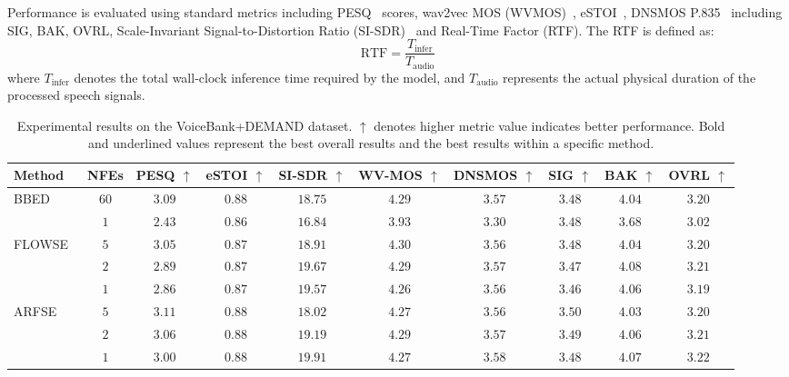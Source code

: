 \documentclass[cameraready]{Interspeech}
\begin{document}
Performance is evaluated using standard metrics including PESQ~\cite{recommendation2001perceptual} scores,  wav2vec MOS (WVMOS)~\cite{andreev2023hifi++}, eSTOI~\cite{jensen2016algorithm}, DNSMOS P.835~\cite{reddy2022dnsmos} including SIG, BAK, OVRL, Scale-Invariant Signal-to-Distortion Ratio (SI-SDR)~\cite{le2019sdr} and Real-Time Factor (RTF). The RTF is defined as:
\begin{equation}
    \text{RTF} = \frac{T_{\text{infer}}}{T_{\text{audio}}}
\end{equation}
where $T_{\text{infer}}$ denotes the total wall-clock inference time required by the model, and $T_{\text{audio}}$ represents the actual physical duration of the processed speech signals.


\begin{table}[t]
  \caption{Experimental results on the VoiceBank+DEMAND dataset. $\uparrow$ denotes higher metric value indicates better performance. Bold and underlined values represent the best overall results and the best results within a specific method.}
  \label{tab:vb_dmd}
  \centering
  \footnotesize
  \setlength{\tabcolsep}{7pt}
  \renewcommand\arraystretch{1.1}
  \begin{tabular}{l c c c c c c c c c}
    \toprule
    \textbf{Method} & \textbf{NFEs} & \textbf{PESQ} $\uparrow$ & \textbf{eSTOI} $\uparrow$ & \textbf{SI-SDR} $\uparrow$ & \textbf{WV-MOS} $\uparrow$ & \textbf{DNSMOS} $\uparrow$ & \textbf{SIG} $\uparrow$ & \textbf{BAK} $\uparrow$ & \textbf{OVRL} $\uparrow$ \\
    \midrule
    \multirow{2}{*}{BBED~\cite{lay23_interspeech}}
    & $60$ & \underline{$3.09$} & \underline{$0.88$} & \underline{$18.75$} & \underline{$4.29$} & \underline{$3.57$} & $3.48$ & \underline{$4.04$} & \underline{$3.20$} \\
    & $1$ & $2.43$ & $0.86$ & $16.84$ & $3.93$ & $3.30$ & $3.48$ & $3.68$ & $3.02$ \\
    \midrule
    \multirow{3}{*}{FLOWSE~\cite{10888274}}
    & $5$ & \underline{$3.05$} & $0.87$ & $18.91$ & \underline{$\mathbf{4.30}$} & $3.56$ & \underline{$3.48$} & $4.04$ & $3.20$ \\
    & $2$ & $2.89$ & $0.87$ & \underline{$19.67$} & $4.29$ & \underline{$3.57$} & $3.47$ & \underline{$\mathbf{4.08}$} & \underline{$3.21$} \\
    & $1$ & $2.86$ & $0.87$ & $19.57$ & $4.26$ & $3.56$ & $3.46$ & $4.06$ & $3.19$ \\
    \midrule
    \multirow{3}{*}{ARFSE}
    & $5$ & \underline{$\mathbf{3.11}$} & $0.88$ & $18.02$ & $4.27$ & $3.56$ & \underline{$\mathbf{3.50}$} & $4.03$ & $3.20$ \\
    & $2$ & $3.06$ & $0.88$ & $19.19$ & \underline{$4.29$} & $3.57$ & $3.49$ & $4.06$ & $3.21$ \\
    & $1$ & $3.00$ & $0.88$ & \underline{$\mathbf{19.91}$} & $4.27$ & \underline{$\mathbf{3.58}$} & $3.48$ & \underline{$4.07$} & \underline{$\mathbf{3.22}$} \\
    \bottomrule
  \end{tabular}
\end{table}
\end{document}
